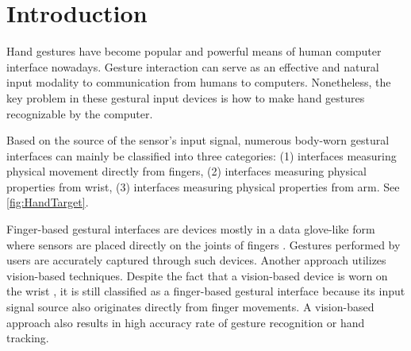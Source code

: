 \documentclass{sigchi}
\begin{document}
\section{Introduction}
Hand gestures have become popular and powerful means of human computer interface nowadays.
Gesture interaction can serve as an effective and natural input modality to communication from humans to computers.
Nonetheless, the key problem in these gestural input devices is how to make hand gestures recognizable by the computer.




Based on the source of the sensor's input signal, numerous body-worn gestural interfaces can mainly be classified into three categories: (1) interfaces measuring physical movement directly from fingers, (2) interfaces measuring physical properties from wrist, (3) interfaces measuring physical properties from arm. See \autoref{fig:HandTarget}.


Finger-based gestural interfaces are devices mostly in a data glove-like form where sensors are placed directly on the joints of fingers \cite{4539650}. Gestures performed by users are accurately captured through such devices.
Another approach utilizes vision-based techniques. Despite the fact that a vision-based device is worn on the wrist \cite{Kim:2012:DFI:2380116.2380139}, it is still classified as a finger-based gestural interface because its input signal source also originates directly from finger movements. A vision-based approach also results in high accuracy rate of gesture recognition or hand tracking.
\end{document}
